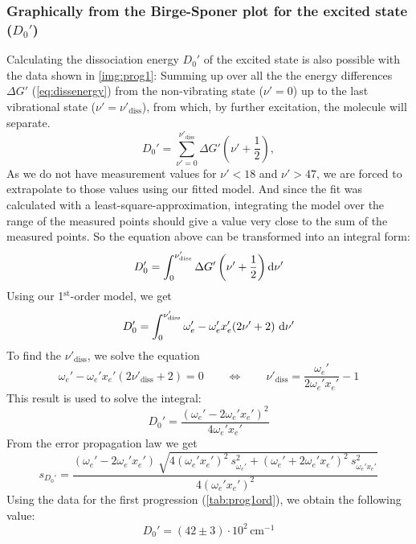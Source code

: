 \subsubsection{Graphically from the Birge-Sponer plot for the excited state ($D_0'$)}
Calculating the dissociation energy $ D_0'$ of the excited state
is also possible with the data shown in \autoref{img:prog1}:
Summing up over all the
the energy differences $\Delta G'$ (\autoref{eq:dissenergy}) from the non-vibrating state ($\nu'=0$) up to the last
vibrational state ($\nu'=\nu'_{\text{diss}}$), from which, by further excitation, the molecule will separate.
\begin{equation}
  D_0' = \sum_{\nu'=0}^{\nu'_{\text{diss}}} \Delta G' \left( \nu' + \frac{1}{2} \right),
\end{equation}
As we do not have measurement values for $\nu'<18$ and $\nu'>47$,
we are forced to extrapolate to those values using our fitted model.
And since the fit was calculated with a least-square-approximation,
integrating the model over the range of the measured points should give a value
very close to the sum of the measured points.
So the equation above can be transformed into an integral form:
\begin{equation}
  D_0' = \int_{0}^{\nu'_{\text{diss}}} \Delta G'\left( \nu' + \frac{1}{2} \right) \mathrm{d} \nu'
\end{equation}
Using our 1$^{\text{st}}$-order model, we get
\begin{equation}
D_0' = \int_{0}^{\nu'_{\text{diss}}} \omega_e' - \omega_e' x_e' (2\nu' + 2) \ \difd \nu'
\end{equation}
To find the $\nu'_{\text{diss}}$, we solve the equation
\begin{equation}
  \omega_e' - \omega_e' x_e' (2\nu'_{\text{diss}} + 2) = 0 \qquad \Leftrightarrow \qquad \nu'_{\text{diss}} =
  \frac{\omega_e'}{2\omega_e' x_e'} - 1
\end{equation}
This result is used to solve the integral:
\begin{equation}
  D_0' = \frac{(\omega_e'-2\omega_e' x_e')^2}{4\omega_e' x_e'}
\end{equation}
From the error propagation law we get
\begin{equation}
  s_{D_0'} = \frac
  {(\omega_e'-2\omega_e' x_e') \ \sqrt{4(\omega_e' x_e')^2 \ s_{\omega_e'}^2 + (\omega_e'+2\omega_e' x_e')^2 \ s_{\omega_e' x_e'}^2}}
  {4(\omega_e' x_e')^2}
\end{equation}
Using the data for the first progression (\autoref{tab:prog1ord}), we obtain the following value:
\begin{equation}
    D_0' = (42 \pm 3) \cdot 10^2\, \text{cm}^{-1}
    \end{equation}

